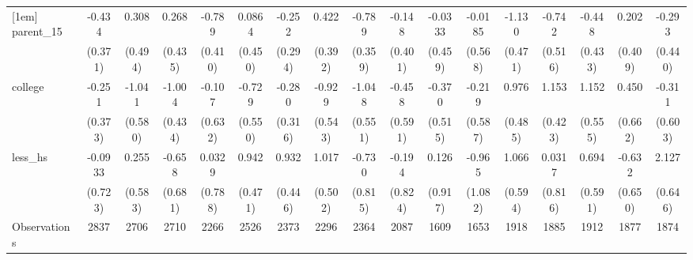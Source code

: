{\begin{tabular}{l*{16}{c}}
[1em]
parent\_15           &      -0.434         &       0.308         &       0.268         &      -0.789         &      0.0864         &      -0.252         &       0.422         &      -0.789\sym{*}  &      -0.148         &     -0.0333         &     -0.0185         &      -1.130\sym{*}  &      -0.742         &      -0.448         &       0.202         &      -0.293         \\
                    &     (0.371)         &     (0.494)         &     (0.435)         &     (0.410)         &     (0.450)         &     (0.294)         &     (0.392)         &     (0.359)         &     (0.401)         &     (0.459)         &     (0.568)         &     (0.471)         &     (0.516)         &     (0.433)         &     (0.409)         &     (0.440)         \\
[1em]
college             &      -0.251         &      -1.041         &      -1.004\sym{*}  &      -0.107         &      -0.729         &      -0.280         &      -0.929         &      -1.048         &      -0.458         &      -0.370         &      -0.219         &       0.976\sym{*}  &       1.153\sym{**} &       1.152\sym{*}  &       0.450         &      -0.311         \\
                    &     (0.373)         &     (0.580)         &     (0.434)         &     (0.632)         &     (0.550)         &     (0.316)         &     (0.543)         &     (0.551)         &     (0.591)         &     (0.515)         &     (0.587)         &     (0.485)         &     (0.423)         &     (0.555)         &     (0.662)         &     (0.603)         \\
[1em]
less\_hs             &     -0.0933         &       0.255         &      -0.658         &      0.0329         &       0.942\sym{*}  &       0.932\sym{*}  &       1.017\sym{*}  &      -0.730         &      -0.194         &       0.126         &      -0.965         &       1.066         &      0.0317         &       0.694         &      -0.632         &       2.127\sym{**} \\
                    &     (0.723)         &     (0.583)         &     (0.681)         &     (0.788)         &     (0.471)         &     (0.446)         &     (0.502)         &     (0.815)         &     (0.824)         &     (0.917)         &     (1.082)         &     (0.594)         &     (0.816)         &     (0.591)         &     (0.650)         &     (0.646)         \\
\hline
Observations        &        2837         &        2706         &        2710         &        2266         &        2526         &        2373         &        2296         &        2364         &        2087         &        1609         &        1653         &        1918         &        1885         &        1912         &        1877         &        1874         \\

\end{tabular}}
